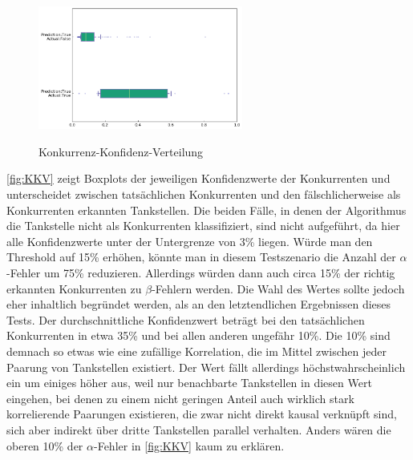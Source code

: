 \begin{figure}[!ht]
	\center
	\includegraphics[width=0.6\textwidth]{Bilder/comp_conf_boxplot.png}\\
	\caption{Konkurrenz-Konfidenz-Verteilung}
	\label{fig:KKV}
\end{figure}

\autoref{fig:KKV} zeigt Boxplots der jeweiligen Konfidenzwerte der Konkurrenten und unterscheidet zwischen tatsächlichen Konkurrenten und den fälschlicherweise als Konkurrenten erkannten Tankstellen. Die beiden Fälle, in denen der Algorithmus die Tankstelle nicht als Konkurrenten klassifiziert, sind nicht aufgeführt, da hier alle Konfidenzwerte unter der Untergrenze von 3\% liegen. Würde man den Threshold auf 15\% erhöhen, könnte man in diesem Testszenario die Anzahl der $\alpha$-Fehler um 75\% reduzieren. Allerdings würden dann auch circa 15\% der richtig erkannten Konkurrenten zu $\beta$-Fehlern werden. Die Wahl des Wertes sollte jedoch eher inhaltlich begründet werden, als an den letztendlichen Ergebnissen dieses Tests. Der durchschnittliche Konfidenzwert beträgt bei den tatsächlichen Konkurrenten in etwa 35\% und bei allen anderen ungefähr 10\%. Die 10\% sind demnach so etwas wie eine zufällige Korrelation, die im Mittel zwischen jeder Paarung von Tankstellen existiert. Der Wert fällt allerdings höchstwahrscheinlich ein um einiges höher aus, weil nur benachbarte Tankstellen in diesen Wert eingehen, bei denen zu einem nicht geringen Anteil auch wirklich stark korrelierende Paarungen existieren, die zwar nicht direkt kausal verknüpft sind, sich aber indirekt über dritte Tankstellen parallel verhalten. Anders wären die oberen 10\% der $\alpha$-Fehler in \autoref{fig:KKV} kaum zu erklären.\\
